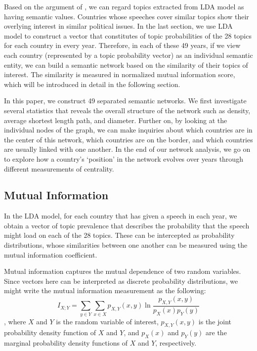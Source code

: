 \documentclass[final,authoryear,3p,12pt,times,hidelinks]{elsarticle}
\begin{document}
Based on the argument of \cite{gurciullo2017topology}, we can regard topics extracted from LDA model as having semantic values. Countries whose speeches cover similar topics show their overlying interest in similar political issues. In the last section, we use LDA model to construct a vector that constitutes of topic probabilities of the 28 topics for each country in every year. Therefore, in each of these 49 years, if we view each country (represented by a topic probability vector) as an individual semantic entity, we can build a semantic network based on the similarity of their topics of interest. The similarity is measured in normalized mutual information score, which will be introduced in detail in the following section. 

In this paper, we construct 49 separated semantic networks. We first investigate several statistics that reveals the overall structure of the network such as density, average shortest length path, and diameter. Further on, by looking at the individual nodes of the graph, we can make inquiries about which countries are in the center of this network, which countries are on the border, and which countries are usually linked with one another. In the end of our network analysis, we go on to explore how a country’s `position' in the network evolves over years through different measurements of centrality. 

\subsection{Mutual Information}
\label{sec:Mutual Information}
In the LDA model, for each country that has given a speech in each year, we obtain a vector of topic prevalence that describes the probability that the speech might load on each of the 28 topics. These can be intercepted as probability distributions, whose similarities between one another can be measured using the mutual information coefficient. 

Mutual information captures the mutual dependence of two random variables. Since vectors here can be interpreted as discrete probability distributions, we might write the mutual information measurement as the following: 
$$I_{X;Y}=\sum_{y \in Y} \sum_{x \in X} p_{X,Y} (x,y) \ln{\frac{p_{X,Y} (x,y)}{p_X (x) p_Y (y)}}
$$
, where $X$ and $Y$ is the random variable of interest, $p_{X,Y} (x,y)$ is the joint probability density function of $X$ and $Y$, and $p_X (x)$ and $p_Y (y)$ are the marginal probability density functions of $X$ and $Y$, respectively. 
\end{document}
